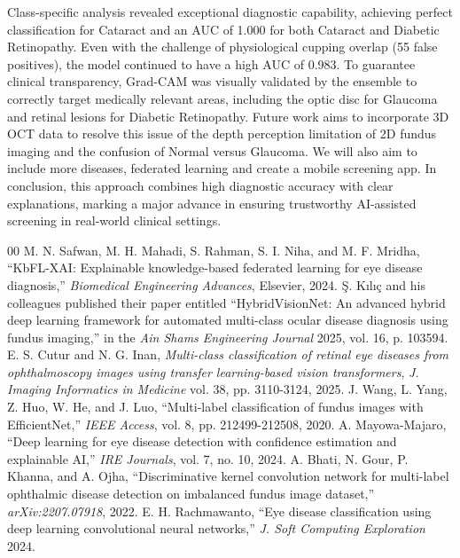 \documentclass[conference]{IEEEtran}
\begin{document}
{{Class-specific analysis revealed exceptional diagnostic capability, achieving perfect classification for Cataract and an AUC of 1.000 for both Cataract and Diabetic Retinopathy. Even with the challenge of physiological cupping overlap (55 false positives), the model continued to have a high AUC of 0.983. To guarantee clinical transparency, Grad-CAM was visually validated by the ensemble to correctly target medically relevant areas, including the optic disc for Glaucoma and retinal lesions for Diabetic Retinopathy. Future work aims to incorporate 3D OCT data to resolve this issue of the depth perception limitation of 2D fundus imaging and the confusion of Normal versus Glaucoma. We will also aim to include more diseases, federated learning and create a mobile screening app. In conclusion, this approach combines high diagnostic accuracy with clear explanations, marking a major advance in ensuring trustworthy AI-assisted screening in real-world clinical settings.
\enlargethispage{2\baselineskip}
\small
\begin{thebibliography}{00}
\setlength{\itemsep}{0pt}
\setlength{\parskip}{0pt}
 M. N. Safwan, M. H. Mahadi, S. Rahman, S. I. Niha, and M. F. Mridha, ``KbFL-XAI: Explainable knowledge-based federated learning for eye disease diagnosis,'' \textit{Biomedical Engineering Advances}, Elsevier, 2024.
 \c{S}. K{\i}l{\i}\c{c} and his colleagues published their paper entitled ``HybridVisionNet: An advanced hybrid deep learning framework for automated multi-class ocular disease diagnosis using fundus imaging,'' in the \textit{Ain Shams Engineering Journal} 2025, vol. 16, p. 103594.
 E. S. Cutur and N. G. Inan, \textit{Multi-class classification of retinal eye diseases from ophthalmoscopy images using transfer learning-based vision transformers}, \textit{J. Imaging Informatics in Medicine} vol. 38, pp. 3110-3124, 2025.
 J. Wang, L. Yang, Z. Huo, W. He, and J. Luo, ``Multi-label classification of fundus images with EfficientNet,'' \textit{IEEE Access}, vol. 8, pp. 212499-212508, 2020.
 A. Mayowa-Majaro, ``Deep learning for eye disease detection with confidence estimation and explainable AI,'' \textit{IRE Journals}, vol. 7, no. 10, 2024.
 A. Bhati, N. Gour, P. Khanna, and A. Ojha, ``Discriminative kernel convolution network for multi-label ophthalmic disease detection on imbalanced fundus image dataset,'' \textit{arXiv:2207.07918}, 2022.
 E. H. Rachmawanto, ``Eye disease classification using deep learning convolutional neural networks,'' \textit{J. Soft Computing Exploration} 2024.

\end{thebibliography}}}
\end{document}
